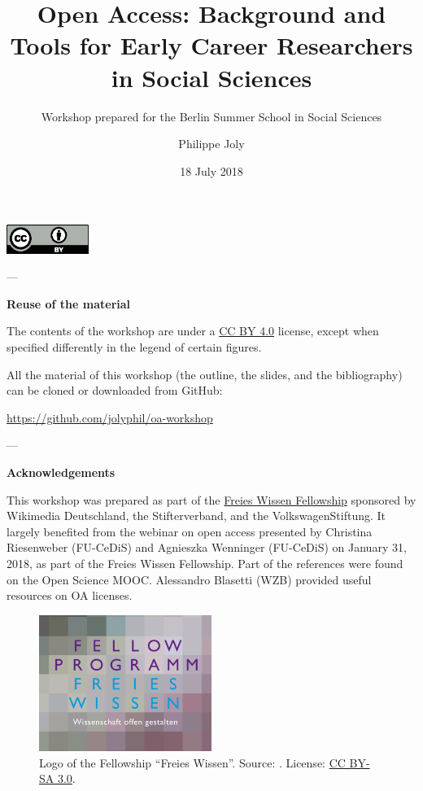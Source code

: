 \documentclass{beamer}
\title[Open access workshop]{Open Access: Background and Tools for Early Career Researchers in Social Sciences}
\subtitle{Workshop prepared for the Berlin Summer School in Social Sciences}
\author[P. Joly]{Philippe Joly}
\institute[HU-Berlin \& WZB]{\texttt{\href{mailto:jolyphil@hu-berlin.de}{jolyphil@hu-berlin.de}} \newline Humboldt-Universität zu Berlin \newline \& \newline WZB Berlin Social Science Center}
\date{18 July 2018}
\begin{document}

\begin{frame}
  \titlepage
\end{frame}


\begin{frame}{}
	\footnotesize{
    \includegraphics[width=0.2\textwidth]{ccby.eps}
    
    ---
    
    \textbf{Reuse of the material}

The contents of the workshop are under a \href{https://creativecommons.org/licenses/by/4.0/}{CC BY 4.0} license, except when specified differently in the legend of certain figures.

	All the material of this workshop (the outline, the slides, and the bibliography) can be cloned or downloaded from GitHub:

	\href{https://github.com/jolyphil/oa-workshop}{https://github.com/jolyphil/oa-workshop}

	---

	\textbf{Acknowledgements}
    
    This workshop was prepared as part of the  \href{https://www.wikimedia.de/wiki/Fellowprogramm}{Freies Wissen Fellowship} sponsored by Wikimedia Deutschland, the Stifterverband, and the VolkswagenStiftung. It largely benefited from the webinar on open access presented by Christina Riesenweber (FU-CeDiS) and Agnieszka Wenninger (FU-CeDiS) on January 31, 2018, as part of the Freies Wissen Fellowship. Part of the references were found on the Open Science MOOC. Alessandro Blasetti (WZB) provided useful resources on OA licenses.
	}
\end{frame}


\begin{frame}{}
\begin{figure}
	\includegraphics[width=0.5\textwidth]{fellow.png}
        \caption{Logo of the Fellowship ``Freies Wissen''. Source: \citet{wikimedia_deutschland_fellow-programm_2018}. License: \href{CC BY-SA 3.0}{CC BY-SA 3.0}.}
\end{figure}
\end{frame}
\end{document}
